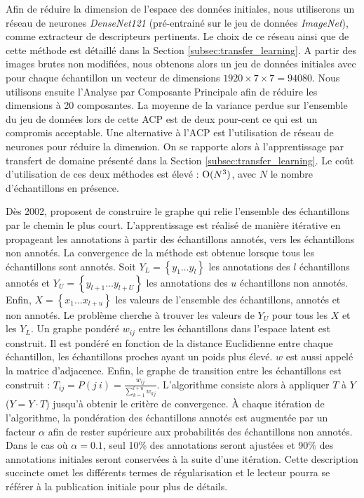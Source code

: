 Afin de réduire la dimension de l'espace des données initiales, nous utiliserons un réseau de neurones \textit{DenseNet121} \cite{huang_densely_2016} (pré-entrainé sur le jeu de données \textit{ImageNet}), comme extracteur de descripteurs pertinents.
Le choix de ce réseau ainsi que de cette méthode est détaillé dans la Section \ref{subsec:transfer_learning}.
A partir des images brutes non modifiées, nous obtenons alors un jeu de données initiales avec pour chaque échantillon un vecteur de dimensions $1920 \times 7 \times 7 = 94 080$.
Nous utilisons ensuite l'Analyse par Composante Principale \cite{jolliffe_principal_2002} afin de réduire les dimensions à 20 composantes. La moyenne de la variance perdue sur l'ensemble du jeu de données lors de cette ACP est de deux pour-cent ce qui est un compromis acceptable.
Une alternative à l'ACP est l'utilisation de réseau de neurones pour réduire la dimension.
On se rapporte alors à l'apprentissage par transfert de domaine présenté dans la Section \ref{subsec:transfer_learning}.
Le coût d'utilisation de ces deux méthodes est élevé : $\operatorname{O}(N^3)$, avec $N$ le nombre d'échantillons en présence.

Dès 2002, \citeauthor{zhu_learning_2002} \cite{zhu_learning_2002} proposent de construire le graphe qui relie l'ensemble des échantillons par le chemin le plus court.
L'apprentissage est réalisé de manière itérative en propageant les annotations à partir des échantillons annotés, vers les échantillons non annotés.
La convergence de la méthode est obtenue lorsque tous les échantillons sont annotés.
Soit $Y_{L}=\left\{y_{1} \ldots y_{l}\right\}$ les annotations des $l$ échantillons annotés et $Y_{U}=\left\{y_{l+1} \ldots y_{l+U}\right\}$ les annotations des $u$ échantillons non annotés.
Enfin, $X=\left\{x_{1} \ldots x_{l+u}\right\}$ les valeurs de l'ensemble des échantillons, annotés et non annotés.
Le problème cherche à trouver les valeurs de $Y_{U}$ pour tous les $X$ et les $Y_{L}$.
Un graphe pondéré $w_{ij}$ entre les échantillons dans l'espace latent est construit. Il est pondéré en fonction de la distance Euclidienne entre chaque échantillon, les échantillons proches ayant un poids plus élevé.
$w$ est aussi appelé la matrice d'adjacence.
Enfin, le graphe de transition entre les échantillons est construit : $T_{i j}=P(j \ i)=\frac{w_{i j}}{\sum_{k=1}^{l+u} w_{k j}}$.
L'algorithme consiste alors à appliquer $T$ à $Y$ ($Y = Y \cdot T$) jusqu'à obtenir le critère de convergence.
À chaque itération de l'algorithme, la pondération des échantillons annotés est augmentée par un facteur $\alpha$ afin de rester supérieure aux probabilités des échantillons non annotés.
Dans le cas où $\alpha = 0.1$, seul 10\% des annotations seront ajustées et 90\% des annotations initiales seront conservées à la suite d'une itération.
Cette description succincte omet les différents termes de régularisation et le lecteur pourra se référer à la publication initiale pour plus de détails.

